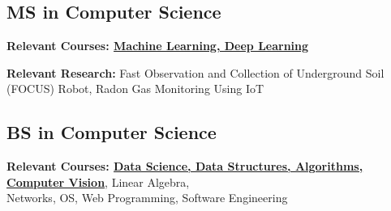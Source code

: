 \subsection{{MS in Computer Science}}
\begin{zitemize}
\item \textbf{Relevant Courses:  \underline{Machine Learning, Deep Learning}}
\item \textbf{Relevant Research: } Fast Observation and Collection of Underground Soil (FOCUS) Robot, Radon Gas Monitoring Using IoT
\end{zitemize}

\subsection{{BS in Computer Science}}
\begin{zitemize}
\item \textbf{Relevant Courses:  \underline{Data Science, Data Structures, Algorithms, Computer Vision}}, Linear Algebra,\\Networks, OS, Web Programming, Software Engineering
\end{zitemize}

